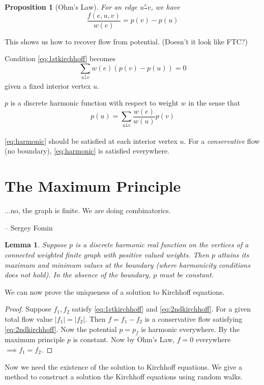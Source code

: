 \documentclass{report}
\newtheorem{lemma}{Lemma}[section]
\newtheorem{proposition}{Proposition}[section]
\theoremstyle{definition}
\theoremstyle{remark}
\numberwithin{equation}{section}
\begin{document}
\begin{proposition}[Ohm's Law] For an edge $u\frac{e}{}v$, we have
    \[\frac{f(e, u, v)}{w(e)} = p(v) - p(u)\]
\end{proposition}
This shows us how to recover flow from potential. (Doesn't it look like FTC?)

Condition \eqref{eq:1stkirchhoff} becomes \begin{equation}
    \sum_{u \frac{e}{} v} w(e)(p(v) - p(u)) = 0
\end{equation}
given a fixed interior vertex $u$. 

$p$ is a discrete harmonic function with respect to weight $w$ in the sense that
\begin{equation}\label{eq:harmonic}
    p(u) = \sum_{u \frac{e}{} v} \frac{w(e)}{w(u)}p(v)
\end{equation}

\eqref{eq:harmonic} should be satisfied at each interior vertex $u$. For a \emph{conservative} flow (no boundary), \eqref{eq:harmonic} is satisfied everywhere.

\section{The Maximum Principle}
\epigraph{...no, the graph is finite. We are doing combinatorics.}{-- \textup{Sergey Fomin}}
\begin{lemma}
    Suppose $p$ is a discrete harmonic real function on the vertices of a connected weighted finite graph with positive valued weights. Then $p$ attains its maximum and minimum values at the boundary (where harmonicity conditions does not hold). In the absence of the boundary, $p$ must be constant.
\end{lemma}
We can now prove the uniqueness of a solution to Kirchhoff equations.
\begin{proof}
    Suppose $f_1, f_2$ satisfy \eqref{eq:1stkirchhoff} and \eqref{eq:2ndkirchhoff}. For a given total flow value $|f_1| = |f_2|$. Then $f = f_1 - f_2$ is a conservative flow satisfying \eqref{eq:2ndkirchhoff}. Now the potential $p = p_f$ is harmonic everywhere. By the maximum principle $p$ is constant. Now by Ohm's Law, $f = 0$ everywhere $\implies f_1 = f_2$.
\end{proof}
Now we need the existence of the solution to Kirchhoff equations. We give a method to construct a solution the Kirchhoff equations using random walks.
\end{document}
